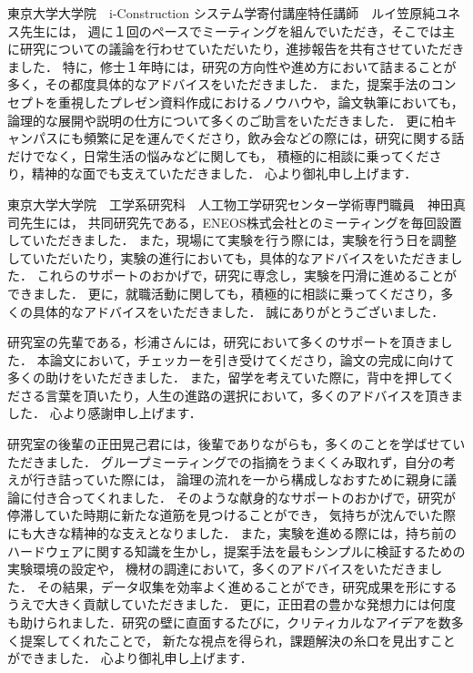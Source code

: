 \documentclass[../main]{subfiles}
\begin{document}
東京大学大学院　i-Construction システム学寄付講座特任講師　ルイ笠原純ユネス先生には，
週に１回のペースでミーティングを組んでいただき，そこでは主に研究についての議論を行わせていただいたり，進捗報告を共有させていただきました．
特に，修士１年時には，研究の方向性や進め方において詰まることが多く，その都度具体的なアドバイスをいただきました．
また，提案手法のコンセプトを重視したプレゼン資料作成におけるノウハウや，論文執筆においても，論理的な展開や説明の仕方について多くのご助言をいただきました．
更に柏キャンパスにも頻繁に足を運んでくださり，飲み会などの際には，研究に関する話だけでなく，日常生活の悩みなどに関しても，
積極的に相談に乗ってくださり，精神的な面でも支えていただきました．
心より御礼申し上げます．


東京大学大学院　工学系研究科　人工物工学研究センター学術専門職員　神田真司先生には，
共同研究先である，ENEOS株式会社とのミーティングを毎回設置していただきました．
また，現場にて実験を行う際には，実験を行う日を調整していただいたり，実験の進行においても，具体的なアドバイスをいただきました．
これらのサポートのおかげで，研究に専念し，実験を円滑に進めることができました．
更に，就職活動に関しても，積極的に相談に乗ってくださり，多くの具体的なアドバイスをいただきました．
誠にありがとうございました．

研究室の先輩である，杉浦さんには，研究において多くのサポートを頂きました．
本論文において，チェッカーを引き受けてくださり，論文の完成に向けて多くの助けをいただきました．
また，留学を考えていた際に，背中を押してくださる言葉を頂いたり，人生の進路の選択において，多くのアドバイスを頂きました．
心より感謝申し上げます．



研究室の後輩の正田晃己君には，後輩でありながらも，多くのことを学ばせていただきました．
グループミーティングでの指摘をうまくくみ取れず，自分の考えが行き詰っていた際には，
論理の流れを一から構成しなおすために親身に議論に付き合ってくれました．
そのような献身的なサポートのおかげで，研究が停滞していた時期に新たな道筋を見つけることができ，
気持ちが沈んでいた際にも大きな精神的な支えとなりました．
また，実験を進める際には，持ち前のハードウェアに関する知識を生かし，提案手法を最もシンプルに検証するための実験環境の設定や，
機材の調達において，多くのアドバイスをいただきました．
その結果，データ収集を効率よく進めることができ，研究成果を形にするうえで大きく貢献していただきました．
更に，正田君の豊かな発想力には何度も助けられました．研究の壁に直面するたびに，クリティカルなアイデアを数多く提案してくれたことで，
新たな視点を得られ，課題解決の糸口を見出すことができました．
心より御礼申し上げます．
\end{document}
